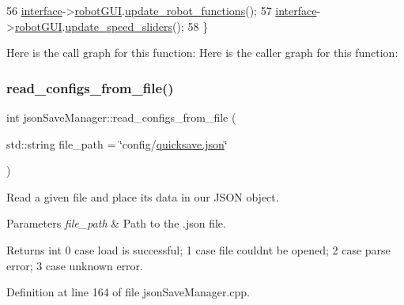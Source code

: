 \begin{DoxyCode}
56     \hyperlink{classjson_save_manager_a91983cf64bdd03c74cd6d4576cb521cf}{interface}->\hyperlink{class_v_s_s_s___g_u_i_1_1_v4_l_interface_ad7fa1969bc6892bad70672aacaa960c7}{robotGUI}.\hyperlink{class_robot_g_u_i_a88e9422aa99db2dd70403650ab1551a4}{update\_robot\_functions}();
57     \hyperlink{classjson_save_manager_a91983cf64bdd03c74cd6d4576cb521cf}{interface}->\hyperlink{class_v_s_s_s___g_u_i_1_1_v4_l_interface_ad7fa1969bc6892bad70672aacaa960c7}{robotGUI}.\hyperlink{class_robot_g_u_i_a7e7796fabb839c7eea5f82387fd10359}{update\_speed\_sliders}();
58 \}
\end{DoxyCode}
Here is the call graph for this function\+:
Here is the caller graph for this function\+:
\mbox{\label{classjson_save_manager_a71683c4903b413a1311e5b10b519ad41}} 
\subsubsection{\texorpdfstring{read\+\_\+configs\+\_\+from\+\_\+file()}{read\_configs\_from\_file()}}
{\footnotesize\ttfamily int json\+Save\+Manager\+::read\+\_\+configs\+\_\+from\+\_\+file (\begin{DoxyParamCaption}\item[{std\+::string}]{file\+\_\+path = {\ttfamily \char`\"{}config/\hyperlink{json_save_manager_8h_ab701e3ac61a85b337ec5c1abaad6742d}{quicksave.\+json}\char`\"{}} }\end{DoxyParamCaption})}



Read a given file and place it\textquotesingle{}s data in our J\+S\+ON object. 


\begin{DoxyParams}{Parameters}
{\em file\+\_\+path} & Path to the .json file. \\
\hline
\end{DoxyParams}
\begin{DoxyReturn}{Returns}
int 0 case load is successful; 1 case file couldn\textquotesingle{}t be opened; 2 case parse error; 3 case unknown error. 
\end{DoxyReturn}


Definition at line 164 of file json\+Save\+Manager.\+cpp.



